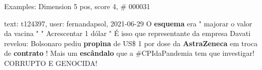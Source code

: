 \begin{frame}{Examples: Dimension 5 pos, score 4, \# 000031}
\footnotesize
\begin{exampleblock}{text: t124397, user: fernandapsol, 2021-06-29}
O \textbf{esquema} era " majorar o valor da vacina " " Acrescentar 1 dólar " É 
isso que representante da empresa Davati revelou: Bolsonaro pediu 
\textbf{propina} de US\$ 1 por dose da \textbf{AstraZeneca} em troca de 
\textbf{contrato} ! Mais um \textbf{escândalo} que a \#CPIdaPandemia tem que 
investigar! CORRUPTO E GENOCIDA! 
\end{exampleblock}
\end{frame}
